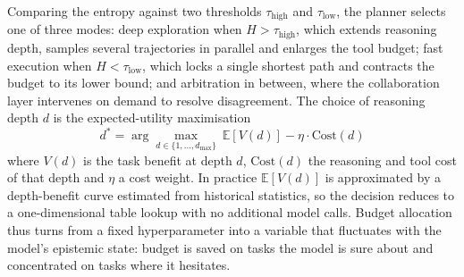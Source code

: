 \documentclass[journal,10pt,a4paper]{IEEEtran}
\begin{document}
Comparing the entropy against two thresholds $\tau_{\mathrm{high}}$ and $\tau_{\mathrm{low}}$, the planner selects one of three modes: deep exploration when $H>\tau_{\mathrm{high}}$, which extends reasoning depth, samples several trajectories in parallel and enlarges the tool budget; fast execution when $H<\tau_{\mathrm{low}}$, which locks a single shortest path and contracts the budget to its lower bound; and arbitration in between, where the collaboration layer intervenes on demand to resolve disagreement. The choice of reasoning depth $d$ is the expected-utility maximisation
\begin{equation}
d^{*}=\arg\max_{d\in\{1,\dots,d_{\max}\}}\ \mathbb{E}[V(d)]-\eta\cdot\mathrm{Cost}(d)
\end{equation}
where $V(d)$ is the task benefit at depth $d$, $\mathrm{Cost}(d)$ the reasoning and tool cost of that depth and $\eta$ a cost weight. In practice $\mathbb{E}[V(d)]$ is approximated by a depth-benefit curve estimated from historical statistics, so the decision reduces to a one-dimensional table lookup with no additional model calls. Budget allocation thus turns from a fixed hyperparameter into a variable that fluctuates with the model's epistemic state: budget is saved on tasks the model is sure about and concentrated on tasks where it hesitates.
\end{document}
